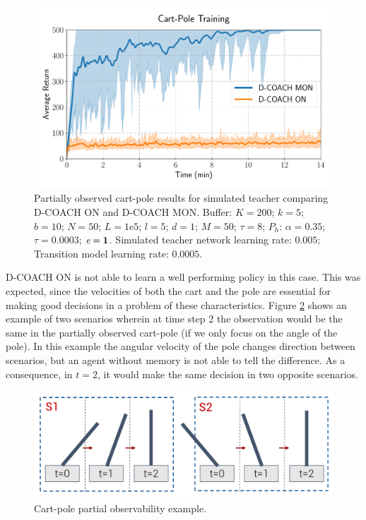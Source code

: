 \begin{figure}[H]
    \centering
    \includegraphics[width=0.7\linewidth]{imagenes/cap3/cartpole_LD_model.pdf}
    \caption[Partially observed Cart-Pole results for simulated teacher comparing D-COACH ON and D-COACH MON.]{Partially observed cart-pole results for simulated teacher comparing D-COACH ON and D-COACH MON.  Buffer: $K = 200$; $k=5$; $b = 10$; $N = 50$; $L=1\mathrm{e}5$; $l=5$; $d=1$; $M=50$; $\tau=8$; $P_{h}$: $\alpha = 0.35$; $\tau = 0.0003$; $\emph{e}=\textbf{1}$. Simulated teacher network learning rate: $0.005$; Transition model learning rate: $0.0005$.}
    \label{fig:ld_cartpole_model}
\end{figure}

D-COACH ON is not able to learn a well performing policy in this case. This was expected, since the velocities of both the cart and the pole are essential for making good decisions in a problem of these characteristics. Figure \ref{fig:cp_ex} shows an example of two scenarios wherein at time step 2 the observation would be the same in the partially observed cart-pole (if we only focus on the angle of the pole). In this example the angular velocity of the pole changes direction between scenarios, but an agent without memory is not able to tell the difference. As a consequence, in $t=2$, it would make the same decision in two opposite scenarios.

\begin{figure}[h]
    \centering
    \includegraphics[width=0.7\linewidth]{imagenes/cap4/cartpole_ex.pdf}
    \caption{Cart-pole partial observability example.}
    \label{fig:cp_ex}
\end{figure}

